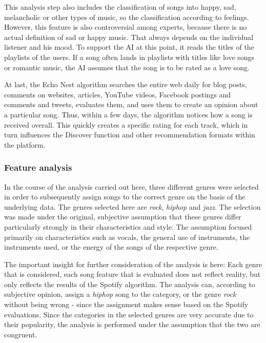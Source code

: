 This analysis step also includes the classification of songs into happy, sad,
melancholic or other types of music, so the classification according to feelings.
However, this feature is also controversial among experts, because there is no actual definition of sad or happy music. 
That always depends on the individual listener and his mood. To support the AI at this point,
it reads the titles of the playlists of the users. 
If a song often lands in playlists with titles like love songs or romantic music,
the AI assumes that the song is to be rated as a love song. \cite[]{Boyd2019}

At last, the Echo Nest algorithm searches the entire web daily for blog posts, comments on websites,
articles, YouTube videos, Facebook postings and comments and tweets, 
evaluates them, and uses them to create an opinion about a particular song.
Thus, within a few days, the algorithm notices how a song is received overall.  
This quickly creates a specific rating for each track, which in turn influences the
Discover function and other recommendation formats within the platform. \cite[]{Boyd2019}

\subsubsection{Feature analysis}
In the course of the analysis carried out here, three different genres were selected in order
to subsequently assign songs to the correct genre on the basis of the underlying data. 
The genres selected here are \emph{rock}, \emph{hiphop} and \emph{jazz}. The selection was made under the original, 
subjective assumption that these genres differ particularly strongly in their characteristics and style. 
The assumption focused primarily on characteristics such as vocals, the general use of instruments,
the instruments used, or the energy of the songs of the respective genre.

The important insight for further consideration of the analysis is here:
Each genre that is considered, each song feature that is evaluated does not reflect reality, 
but only reflects the results of the Spotify algorithm. The analysis can,
according to subjective opinion, assign a \emph{hiphop} song to the category, 
or the genre \emph{rock} without being wrong - since the assignment makes sense based on the Spotify evaluations. 
Since the categories in the selected genres are very accurate due to their popularity,
the analysis is performed under the assumption that the two are congruent. 

